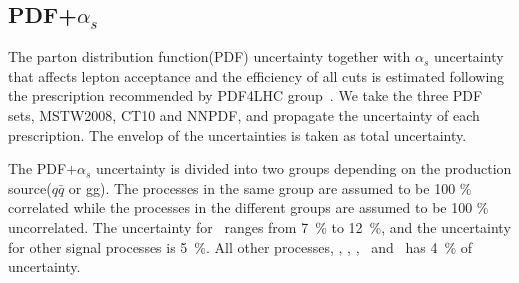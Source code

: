 \subsection{PDF+$\alpha_s$}

The parton distribution function(PDF) uncertainty together with $\alpha_s$ uncertainty 
that affects lepton acceptance and the efficiency of all cuts 
is estimated following the prescription recommended by PDF4LHC group~\cite{Botje:2011sn}. 
We take the three PDF sets, MSTW2008, CT10 and NNPDF, 
and propagate the uncertainty of each prescription. 
The envelop of the uncertainties is taken as total uncertainty. 

The PDF+$\alpha_s$ uncertainty is divided into two groups depending on the 
production source($q\bar{q}$ or gg). 
The processes in the same group are assumed to be 100 \% correlated 
while the processes in the different groups are assumed to be 100 \% uncorrelated.
The uncertainty for \ggH\ ranges from 7~\% to 12~\%,  
and the uncertainty for other signal processes is 5~\%.
All other processes, \ggww, \qqww, \vv, \wgamma\ and \wgammastar\  has 4~\% of uncertainty.

